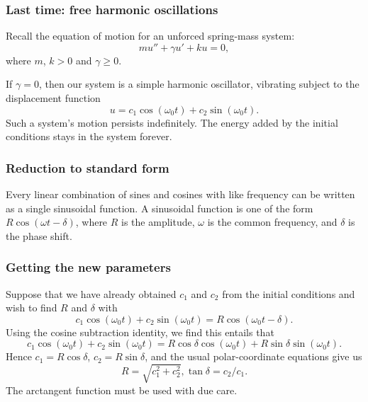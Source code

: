 \def\encoding{UTF-8}

\def\mytitle{Further investigation of harmonic vibration}
\def\affiliation{The College of Idaho}
\def\myauthor{Math 352 Differential Equations}
\def\mydate{17 April 2013}
\def\latexmode{beamer}

\def\htmlheaderlevel{2  \\
\# Recap}
\begin{frame}

\frametitle{Last time: free harmonic oscillations}
\label{lasttime:freeharmonicoscillations}

Recall the equation of motion for an unforced spring-mass system:
\[
    mu'' + \gamma u' + k u = 0,
\]
where $ m $, $ k > 0 $ and $ \gamma \geq 0$.

If $ \gamma = 0 $, then our system is a simple harmonic oscillator, vibrating subject to the displacement function
\[
    u = c_1 \cos{(\omega_0 t)} + c_2 \sin{(\omega_0 t)}.
\]
Such a system's motion persists indefinitely. The energy added by the initial conditions stays in the system forever.

\end{frame}

\begin{frame}

\frametitle{Reduction to standard form}
\label{reductiontostandardform}

Every linear combination of sines and cosines with like frequency can be written as a single sinusoidal function. A sinusoidal function is one of the form
$ R \cos{(\omega t - \delta)} $,
where $ R $ is the amplitude, $ \omega $ is the common frequency, and $ \delta $ is the phase shift.

\end{frame}

\begin{frame}

\frametitle{Getting the new parameters}
\label{gettingthenewparameters}

Suppose that we have already obtained $ c_1 $ and $ c_2 $ from the initial conditions and wish to find $ R $ and $ \delta $ with
\[
    c_1 \cos{(\omega_0 t)} + c_2 \sin{(\omega_0 t)} = R \cos{(\omega_0 t - \delta)}.
\]
Using the cosine subtraction identity, we find this entails that
\[
    c_1 \cos{(\omega_0 t)} + c_2 \sin{(\omega_0 t)} = R \cos{\delta} \cos{(\omega_0 t)} + R \sin{\delta} \sin{(\omega_0 t)}.
\]
Hence $ c_1 = R \cos{\delta} $, $ c_2 = R \sin{\delta} $, and the usual polar-coordinate equations give us
\[
    R = \sqrt{c_1^2 + c_2^2}, \tan{\delta} = c_2/c_1.
\]
The arctangent function must be used with due care.

\end{frame}


